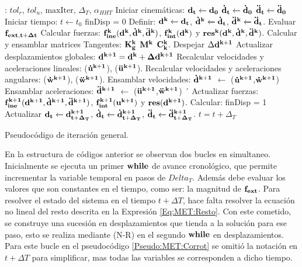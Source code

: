 \begin{algorithm}\label{Pseudo:MET:Corrot}
	\begin{algorithmic} 
		\REQUIRE: $tol_r$, $tol_u$, $\text{maxIter}$, $\Delta_T$, $\alpha_{HHT}$
		\STATE Iniciar cinemáticas: $\bf{d_t}\xleftarrow[]{}\bf{d_0}$
		$\bf{\dot{d}_t}\xleftarrow[]{}\bf{\dot{d}_0}$
		$\bf{\ddot{d}_t}\xleftarrow[]{}\bf{\ddot{d}_0}$ 
		\STATE Iniciar tiempo: $t\xleftarrow{}t_0$
			\STATE finDisp = $0$
			\STATE Definir: $\bf{d^k}\xleftarrow[]{}\bf{d_t}$, $\bf{\dot{d}^k}\xleftarrow[]{}\bf{\dot{d}_t}$, $\bf{\ddot{d}^k}\xleftarrow[]{}\bf{\ddot{d}_t}$.
			\STATE Evaluar $\bf{f_{ext,t+\Delta t}}$	
				\STATE Calcular fuerzas: $\bf{f}_{ine}^k(\bf{d}^k,\bf{\dot{d}}^k,\bf{\ddot{d}}^k)$,  $\bf{f}_{int}^k(\bf{d}^k)$ y $\bf{res}^{k}(\bf{d}^k,\bf{\dot{d}}^k,\bf{\ddot{d}}^k)$. 
				\STATE Calcular y ensamblar matrices Tangentes: $\bf{K}_g^k$ $\bf{M}^k$  $\bf{C}_k^k$. 
				\STATE Despejar $\Delta \bf{d}^{k+1}$ 
				\STATE Actualizar desplazamientos globales:  $\bf{d}^{k+1} = \bf{d}^{k} + \Delta\bf{d}^{k+1}$ 
				\STATE Recalcular velocidades y aceleraciones lineales: ($\bf{\dot{u}}^{k+1}$), ($\bf{\ddot{u}}^{k+1}$).
				\STATE Recalcular velocidades y aceleraciones angulares: ($\bf{\dot{w}}^{k+1}$), ($\bf{\ddot{w}}^{k+1}$).
				\STATE Ensamblar velocidades: $\bf{\dot{d}}^{k+1}$ $\leftarrow$ ($\bf{\dot{u}}^{k+1}$,$\bf{\dot{w}}^{k+1}$)
				\STATE Ensamblar aceleraciones: $\bf{\ddot{d}}^{k+1}$ $\leftarrow$ ($\bf{\ddot{u}}^{k+1}$,$\bf{\ddot{w}}^{k+1}$)
´				\STATE Actualizar fuerzas: 	$\bf{f}_{ine}^{k+1}(\bf{d}^{k+1},\bf{\dot{d}}^{k+1},\bf{\ddot{d}}^{k+1})$,  $\bf{f}_{int}^{k+1}(\bf{u}^{k+1})$ y $\bf{res}(\bf{d}^{k+1})$. 
				\STATE Calcular: 
				\STATE finDisp = 1
				\ENDIF
			\ENDWHILE
			\STATE Actualizar $\bf{d_{t}}\xleftarrow[]{}\bf{d^{k+1}_{t+\Delta_T}}$, $\bf{\dot{d}_{t}}\xleftarrow[]{}\bf{\dot{d}^{k+1}_{t+\Delta_T}}$, $\bf{\ddot{d}_t}\xleftarrow[]{}\bf{\ddot{d}^{k+1}_{t+\Delta_T}}$.
			\STATE $t = t+\Delta_T$	
 		\ENDWHILE
	\end{algorithmic}
\caption{Pseudocódigo de iteración general. }
\end{algorithm}

En la estructura de códigos anterior se observan dos bucles en simultaneo. Inicialmente se ejecuta un primer $\bf{while}$ de avance cronológico, que permite incrementar la variable temporal en pasos de $Delta_T$. Además debe evaluar los valores que son constantes en el tiempo, como ser: la magnitud de $\bf{f}_{ext}$. Para resolver el estado del sistema en el tiempo $t+\Delta T$, hace falta resolver la ecuación no lineal del resto descrita en la Expresión \eqref{Eq:MET:Resto}. Con este cometido, se construye una sucesión en desplazamientos que tienda a la solución para ese paso, esto se realiza mediante (N-R) en el segundo $\bf{while}$ en desplazamientos. Para este bucle en el pseudocódigo \ref{Pseudo:MET:Corrot} se omitió la notación en $t+\Delta T$ para simplificar, mas todas las variables se corresponden a dicho tiempo.

